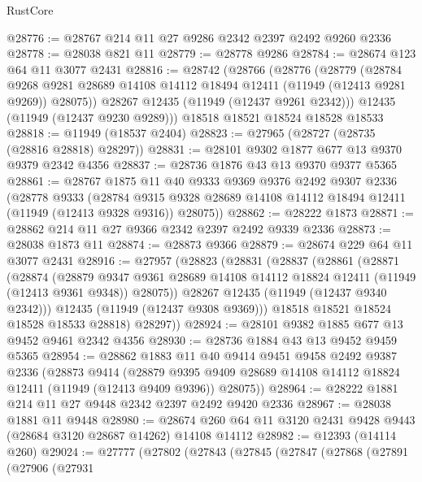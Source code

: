 \begin{lexlean}{RustCore}
\begin{coremodule}
@28776 := @28767 @214 @11 @27 @9286 @2342 @2397 @2492 @9260 @2336
@28778 := @28038 @821 @11
@28779 := @28778 @9286
@28784 := @28674 @123 @64 @11 @3077 @2431
@28816 := @28742
    (@28766
      (@28776
        (@28779
          (@28784
            @9268
            @9281
            @28689
            @14108
            @14112
            @18494
            @12411
            (@11949 (@12413 @9281 @9269))
            @28075))
        @28267
        @12435
        (@11949 (@12437 @9261 @2342)))
      @12435
      (@11949 (@12437 @9230 @9289)))
    @18518
    @18521
    @18524
    @18528
    @18533
@28818 := @11949 (@18537 @2404)
@28823 := @27965 (@28727 (@28735 (@28816 @28818) @28297))
@28831 := @28101 @9302 @1877 @677 @13 @9370 @9379 @2342 @4356
@28837 := @28736 @1876 @43 @13 @9370 @9377 @5365
@28861 := @28767
    @1875
    @11
    @40
    @9333
    @9369
    @9376
    @2492
    @9307
    @2336
    (@28778
      @9333
      (@28784 @9315 @9328 @28689 @14108 @14112 @18494 @12411 (@11949 (@12413 @9328 @9316)) @28075))
@28862 := @28222 @1873
@28871 := @28862 @214 @11 @27 @9366 @2342 @2397 @2492 @9339 @2336
@28873 := @28038 @1873 @11
@28874 := @28873 @9366
@28879 := @28674 @229 @64 @11 @3077 @2431
@28916 := @27957
    (@28823
      (@28831
        (@28837
          (@28861
            (@28871
              (@28874
                (@28879
                  @9347
                  @9361
                  @28689
                  @14108
                  @14112
                  @18824
                  @12411
                  (@11949 (@12413 @9361 @9348))
                  @28075))
              @28267
              @12435
              (@11949 (@12437 @9340 @2342)))
            @12435
            (@11949 (@12437 @9308 @9369)))
          @18518
          @18521
          @18524
          @18528
          @18533
          @28818)
        @28297))
@28924 := @28101 @9382 @1885 @677 @13 @9452 @9461 @2342 @4356
@28930 := @28736 @1884 @43 @13 @9452 @9459 @5365
@28954 := @28862
    @1883
    @11
    @40
    @9414
    @9451
    @9458
    @2492
    @9387
    @2336
    (@28873
      @9414
      (@28879 @9395 @9409 @28689 @14108 @14112 @18824 @12411 (@11949 (@12413 @9409 @9396)) @28075))
@28964 := @28222 @1881 @214 @11 @27 @9448 @2342 @2397 @2492 @9420 @2336
@28967 := @28038 @1881 @11 @9448
@28980 := @28674 @260 @64 @11 @3120 @2431 @9428 @9443 (@28684 @3120 @28687 @14262) @14108 @14112
@28982 := @12393 (@14114 @260)
@29024 := @27777
    (@27802
      (@27843
        (@27845
          (@27847
            (@27868
              (@27891
                (@27906
                  (@27931

\end{coremodule}
\end{lexlean}

